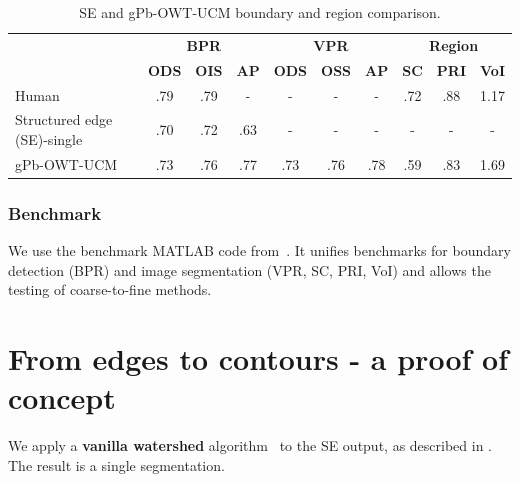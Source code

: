 \begin{table}[htbp]
\renewcommand{\arraystretch}{1.3}
\centering
\scriptsize
\begin{tabular}{l|c|c|c||c|c|c||c|c|c|}
\cline{2-10} %
\multirow{2}{*}{} & \multicolumn{3}{c||}{\textbf{BPR}} & \multicolumn{3}{c||}{\textbf{VPR}}& \multicolumn{3}{c|}{\textbf{Region}}\\
\cline{2-10}
& \textbf{ODS}  & \textbf{OIS} & \textbf{AP} %
& \textbf{ODS} & \textbf{OSS} & \textbf{AP} %
& \textbf{SC} & \textbf{PRI} & \textbf{VoI} \\
\hline
\multicolumn{1}{|l|}{Human} & .79 & .79 & - & - & - & - & .72 & .88 & 1.17 \\ %
\hline
\hline
\multicolumn{1}{|l|}{\cite{DollarICCV13edges} Structured edge (SE)-single} & .70 & .72 & .63 & - & - & - & - & - & - \\
\hline
\multicolumn{1}{|l|}{\cite{Arbelaez11} gPb-OWT-UCM} & .73 & .76 & .77 & .73 & .76 & .78 & .59 & .83 & 1.69 \\
\hline
\end{tabular}
\caption[SE and gPb-OWT-UCM boundary and region comparison]{SE and gPb-OWT-UCM boundary and region comparison.}
\label{tab:SE_vs_gPb_OWT_UCM}
\end{table}

\subsubsection{Benchmark}
We use the benchmark MATLAB code from~\cite{Galasso13Benchmark}. %
It unifies benchmarks for boundary detection (BPR) and image segmentation (VPR, SC, %
PRI, VoI) and allows the testing of coarse-to-fine methods. %

\section{From edges to contours - a proof of concept}
We apply a {\bf vanilla watershed} algorithm~\cite{beucher1992morphological,najman1996geodesic,PINKlibrary} to the SE output, as described in . The result is a single segmentation. 

